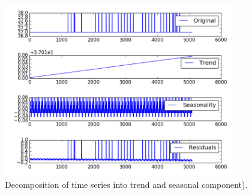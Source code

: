 \documentclass[12pt]{article}
\begin{document}
\begin{figure}
\includegraphics[width=0.9\textwidth]{11474/decomposition.png}
\caption{Decomposition of time series into trend and seasonal component).} \label{fg:decomp}
\end{figure}
\end{document}
